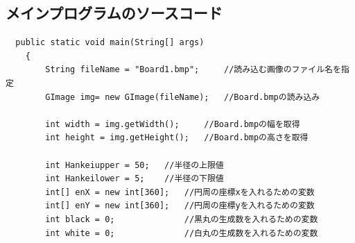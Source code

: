 \documentclass{jsarticle}
\begin{document}
\subsection{メインプログラムのソースコード}
\begin{verbatim}
  public static void main(String[] args)
	{
        String fileName = "Board1.bmp";     //読み込む画像のファイル名を指定
        GImage img= new GImage(fileName);   //Board.bmpの読み込み

        int width = img.getWidth();     //Board.bmpの幅を取得
        int height = img.getHeight();   //Board.bmpの高さを取得
        
        int Hankeiupper = 50;   //半径の上限値
        int Hankeilower = 5;    //半径の下限値
        int[] enX = new int[360];   //円周の座標xを入れるための変数
        int[] enY = new int[360];   //円周の座標yを入れるための変数
        int black = 0;              //黒丸の生成数を入れるための変数
        int white = 0;              //白丸の生成数を入れるための変数


\end{verbatim}
\end{document}
